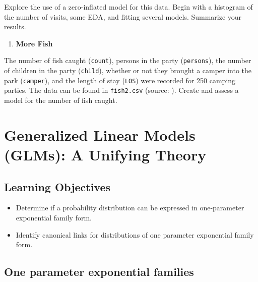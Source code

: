 \documentclass[
]{krantz}
\providecommand{\tightlist}{%
  \setlength{\itemsep}{0pt}\setlength{\parskip}{0pt}}
\begin{document}
Explore the use of a zero-inflated model for this data. Begin with a histogram of the number of visits, some EDA, and fitting several models. Summarize your results.

\begin{enumerate}
\def\labelenumi{\arabic{enumi}.}
\setcounter{enumi}{3}
\tightlist
\item
  \textbf{More Fish}
\end{enumerate}

The number of fish caught (\texttt{count}), persons in the party (\texttt{persons}), the number of children in the party (\texttt{child}), whether or not they brought a camper into the park (\texttt{camper}), and the length of stay (\texttt{LOS}) were recorded for 250 camping parties. The data can be found in \texttt{fish2.csv} (source: \citep{idre2018}). Create and assess a model for the number of fish caught.

\hypertarget{ch-glms}{%
\chapter{Generalized Linear Models (GLMs): A Unifying Theory}\label{ch-glms}}

\hypertarget{learning-objectives-4}{%
\section{Learning Objectives}\label{learning-objectives-4}}

\begin{itemize}
\tightlist
\item
  Determine if a probability distribution can be expressed in one-parameter exponential family form.
\item
  Identify canonical links for distributions of one parameter exponential family form.
\end{itemize}

\hypertarget{one-parameter-exponential-families}{%
\section{One parameter exponential families}\label{one-parameter-exponential-families}}
\end{document}
